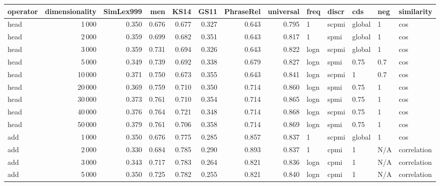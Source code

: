 \begin{tabular}{lrrrrrrrlllll}
\toprule
operator &  dimensionality &  SimLex999 &    men &   KS14 &   GS11 &  PhraseRel &  universal &  freq &  discr &     cds &  neg &     similarity \\
\midrule
    head &            1\,000 &      0.350 &  0.676 &  0.677 &  0.327 &      0.643 &      0.795 &     1 &  scpmi &  global &    1 &            cos \\
    head &            2\,000 &      0.359 &  0.699 &  0.682 &  0.351 &      0.643 &      0.817 &     1 &   spmi &  global &    1 &            cos \\
    head &            3\,000 &      0.359 &  0.731 &  0.694 &  0.326 &      0.643 &      0.822 &  logn &  scpmi &  global &    1 &            cos \\
    head &            5\,000 &      0.349 &  0.739 &  0.692 &  0.338 &      0.679 &      0.827 &  logn &   spmi &    0.75 &  0.7 &            cos \\
    head &           10\,000 &      0.371 &  0.750 &  0.673 &  0.355 &      0.643 &      0.841 &  logn &  scpmi &       1 &  0.7 &            cos \\
    head &           20\,000 &      0.369 &  0.759 &  0.710 &  0.350 &      0.714 &      0.860 &  logn &   spmi &    0.75 &    1 &            cos \\
    head &           30\,000 &      0.373 &  0.761 &  0.710 &  0.354 &      0.714 &      0.865 &  logn &   spmi &    0.75 &    1 &            cos \\
    head &           40\,000 &      0.376 &  0.764 &  0.721 &  0.348 &      0.714 &      0.868 &  logn &  scpmi &    0.75 &    1 &            cos \\
    head &           50\,000 &      0.379 &  0.761 &  0.706 &  0.358 &      0.714 &      0.869 &  logn &   spmi &    0.75 &    1 &            cos \\
     add &            1\,000 &      0.350 &  0.676 &  0.775 &  0.285 &      0.857 &      0.837 &     1 &  scpmi &  global &    1 &            cos \\
     add &            2\,000 &      0.330 &  0.684 &  0.785 &  0.290 &      0.893 &      0.837 &     1 &   cpmi &       1 &  N/A &    correlation \\
     add &            3\,000 &      0.343 &  0.717 &  0.783 &  0.264 &      0.821 &      0.836 &  logn &   cpmi &       1 &  N/A &    correlation \\
     add &            5\,000 &      0.350 &  0.725 &  0.782 &  0.255 &      0.821 &      0.840 &  logn &   cpmi &       1 &  N/A &    correlation \\

\end{tabular}
